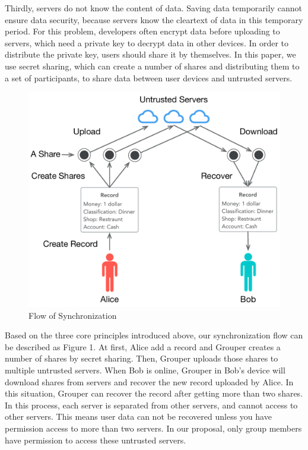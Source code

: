 \documentclass[twocolumn,10pt]{article}
\begin{document}
Thirdly, servers do not know the content of data. Saving data temporarily cannot ensure data security, because servers know the cleartext of data in this temporary period. For this problem, developers often encrypt data before uploading to servers, which need a private key to decrypt data in other devices. In order to distribute the private key, users should share it by themselves. In this paper, we use secret sharing, which can create a number of shares and distributing them to a set of participants\cite{smith2013layered}, to share data between user devices and untrusted servers.

\begin{figure}[t]
\centering
\includegraphics[scale=0.35]{sync_flow}
\caption{Flow of Synchronization}
\end{figure}
Based on the three core principles introduced above, our synchronization flow can be described as Figure 1. At first, Alice add a record and Grouper creates a number of shares by secret sharing. Then, Grouper uploads those shares to multiple untrusted servers. When Bob is online, Grouper in Bob's device will download shares from servers and recover the new record uploaded by Alice. In this situation, Grouper can recover the record after getting more than two shares. In this process, each server is separated from other servers, and cannot access to other servers. This means user data can not be recovered unless you have permission access to more than two servers. In our proposal, only group members have permission to access these untrusted servers.
\end{document}
